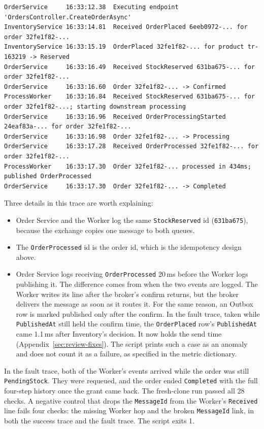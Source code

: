 \documentclass[a4paper]{report}
\begin{document}
\begin{Verbatim}[breaklines=true,breakanywhere=true,fontsize=\footnotesize]
OrderService     16:33:12.38  Executing endpoint 'OrdersController.CreateOrderAsync'
InventoryService 16:33:14.81  Received OrderPlaced 6eeb0972-... for order 32fe1f82-...
InventoryService 16:33:15.19  OrderPlaced 32fe1f82-... for product tr-163219 -> Reserved
OrderService     16:33:16.49  Received StockReserved 631ba675-... for order 32fe1f82-...
OrderService     16:33:16.60  Order 32fe1f82-... -> Confirmed
ProcessWorker    16:33:16.84  Received StockReserved 631ba675-... for order 32fe1f82-...; starting downstream processing
OrderService     16:33:16.96  Received OrderProcessingStarted 24eaf83a-... for order 32fe1f82-...
OrderService     16:33:16.98  Order 32fe1f82-... -> Processing
OrderService     16:33:17.28  Received OrderProcessed 32fe1f82-... for order 32fe1f82-...
ProcessWorker    16:33:17.30  Order 32fe1f82-... processed in 434ms; published OrderProcessed
OrderService     16:33:17.30  Order 32fe1f82-... -> Completed
\end{Verbatim}

Three details in this trace are worth explaining:
\begin{itemize}
  \item Order Service and the Worker log the same \texttt{StockReserved}
    id (\texttt{631ba675}), because the exchange copies one message to both
    queues.
  \item The \texttt{OrderProcessed} id is the order id, which is the
    idempotency design above.
  \item Order Service logs receiving \texttt{OrderProcessed} 20\,ms before
    the Worker logs publishing it. The difference comes from when the two
    events are logged. The Worker writes its line after the broker's confirm
    returns, but the broker delivers the message as soon as it routes it. For
    the same reason, an
    Outbox row is marked published only after the confirm. In the fault
    trace, taken while \texttt{PublishedAt} still held the confirm time, the
    \texttt{OrderPlaced} row's \texttt{PublishedAt} came 1.1\,ms after
    Inventory's decision. It now holds the send time
    (Appendix~\ref{sec:review-fixes}). The script prints such a case as an anomaly
    and does not count it as a failure, as specified in the metric dictionary.
\end{itemize}
In the fault trace, both of the Worker's events arrived while the order was
still \texttt{PendingStock}. They were requeued, and the order ended
\texttt{Completed} with the full four-step history once the grant came back.
The fresh-clone run passed all 28 checks. A negative control that drops the
\texttt{MessageId} from the Worker's \texttt{Received} line fails four checks:
the missing Worker hop and the broken \texttt{MessageId} link, in both the
success trace and the fault trace. The script exits 1.
\end{document}
